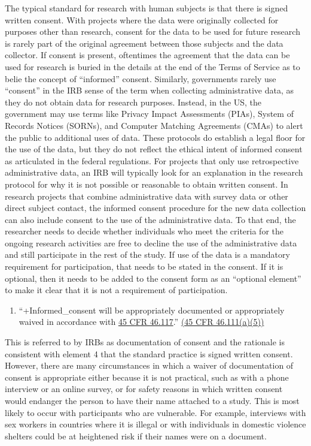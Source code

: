 \documentclass[
]{book}
\providecommand{\tightlist}{%
  \setlength{\itemsep}{0pt}\setlength{\parskip}{0pt}}
\begin{document}
The typical standard for research with human subjects is that there is signed written consent. With projects where the data were originally collected for purposes other than research, consent for the data to be used for future research is rarely part of the original agreement between those subjects and the data collector. If consent is present, oftentimes the agreement that the data can be used for research is buried in the details at the end of the Terms of Service as to belie the concept of ``informed'' consent. Similarly, governments rarely use ``consent'' in the IRB sense of the term when collecting administrative data, as they do not obtain data for research purposes. Instead, in the US, the government may use terms like Privacy Impact Assessments (PIAs), System of Records Notices (SORNs), and Computer Matching Agreements (CMAs) to alert the public to additional uses of data. These protocols do establish a legal floor for the use of the data, but they do not reflect the ethical intent of informed consent as articulated in the federal regulations. For projects that only use retrospective administrative data, an IRB will typically look for an explanation in the research protocol for why it is not possible or reasonable to obtain written consent. In research projects that combine administrative data with survey data or other direct subject contact, the informed consent procedure for the new data collection can also include consent to the use of the administrative data. To that end, the researcher needs to decide whether individuals who meet the criteria for the ongoing research activities are free to decline the use of the administrative data and still participate in the rest of the study. If use of the data is a mandatory requirement for participation, that needs to be stated in the consent. If it is optional, then it needs to be added to the consent form as an ``optional element'' to make it clear that it is not a requirement of participation.

\begin{enumerate}
\def\labelenumi{(\arabic{enumi})}
\setcounter{enumi}{4}
\tightlist
\item
  ``+Informed\_consent\textbar{} will be appropriately documented or appropriately waived in accordance with \href{https://www.law.cornell.edu/cfr/text/45/46.117}{45 CFR 46.117}.'' \href{https://www.law.cornell.edu/cfr/text/45/46.111}{(45 CFR 46.111(a)(5))}
\end{enumerate}

This is referred to by IRBs as documentation of consent and the rationale is consistent with element 4 that the standard practice is signed written consent. However, there are many circumstances in which a waiver of documentation of consent is appropriate either because it is not practical, such as with a phone interview or an online survey, or for safety reasons in which written consent would endanger the person to have their name attached to a study. This is most likely to occur with participants who are vulnerable. For example, interviews with sex workers in countries where it is illegal or with individuals in domestic violence shelters could be at heightened risk if their names were on a document.
\end{document}
